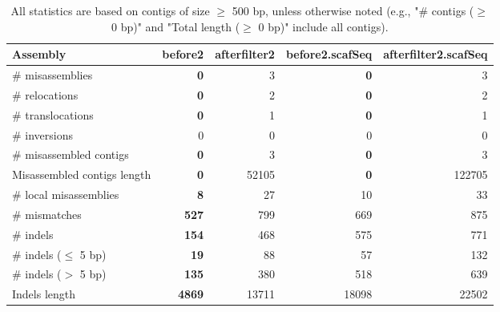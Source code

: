 \documentclass[12pt,a4paper]{article}
\begin{document}
\begin{table}[ht]
\begin{center}
\caption{All statistics are based on contigs of size $\geq$ 500 bp, unless otherwise noted (e.g., "\# contigs ($\geq$ 0 bp)" and "Total length ($\geq$ 0 bp)" include all contigs).}
\begin{tabular}{|l*{4}{|r}|}
\hline
Assembly & before2 & afterfilter2 & before2.scafSeq & afterfilter2.scafSeq \\ \hline
\# misassemblies & {\bf 0} & 3 & {\bf 0} & 3 \\ \hline
\hspace{5mm}\# relocations & {\bf 0} & 2 & {\bf 0} & 2 \\ \hline
\hspace{5mm}\# translocations & {\bf 0} & 1 & {\bf 0} & 1 \\ \hline
\hspace{5mm}\# inversions & 0 & 0 & 0 & 0 \\ \hline
\# misassembled contigs & {\bf 0} & 3 & {\bf 0} & 3 \\ \hline
Misassembled contigs length & {\bf 0} & 52105 & {\bf 0} & 122705 \\ \hline
\# local misassemblies & {\bf 8} & 27 & 10 & 33 \\ \hline
\# mismatches & {\bf 527} & 799 & 669 & 875 \\ \hline
\# indels & {\bf 154} & 468 & 575 & 771 \\ \hline
\hspace{5mm}\# indels ($\leq$ 5 bp) & {\bf 19} & 88 & 57 & 132 \\ \hline
\hspace{5mm}\# indels ($>$ 5 bp) & {\bf 135} & 380 & 518 & 639 \\ \hline
Indels length & {\bf 4869} & 13711 & 18098 & 22502 \\ \hline
\end{tabular}
\end{center}
\end{table}
\end{document}
